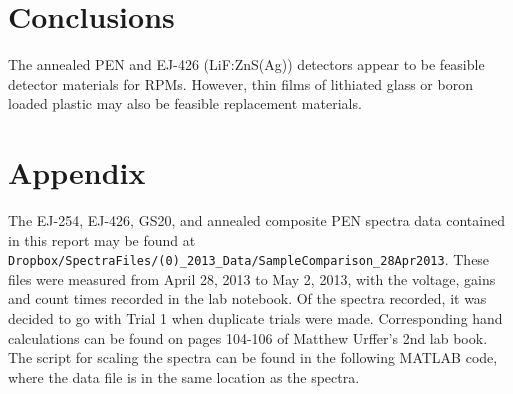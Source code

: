 \documentclass[onecolumn]{IEEEtran}
\begin{document}
\section{Conclusions}
The annealed PEN and EJ-426 (LiF:ZnS(Ag)) detectors appear to be feasible detector materials for RPMs.
However, thin films of lithiated glass or boron loaded plastic may also be feasible replacement materials.
\section{Appendix}
The EJ-254, EJ-426, GS20, and annealed composite PEN spectra data contained in this report may be found at \verb+Dropbox/SpectraFiles/(0)_2013_Data/SampleComparison_28Apr2013+.
These files were measured from April 28, 2013 to May 2, 2013, with the voltage, gains and count times recorded in the lab notebook. 
Of the spectra recorded, it was decided to go with Trial 1 when duplicate trials were made.
Corresponding hand calculations can be found on pages 104-106 of Matthew Urffer's 2nd lab book.
The script for scaling the spectra can be found in the following MATLAB code, where the data file is in the same location as the spectra.
\end{document}
